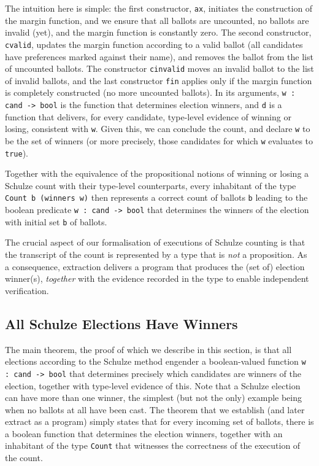 \noindent
The intuition here is simple: the first constructor, \texttt{ax},
initiates the construction of the margin function, and we ensure
that all ballots are uncounted, no ballots are invalid (yet), and the
margin function is constantly zero. The second constructor,
\texttt{cvalid}, updates the margin function according to a valid
ballot (all candidates have preferences marked against their name),
and removes the ballot from the list of uncounted ballots. The
constructor \texttt{cinvalid} moves an invalid ballot to the list of
invalid ballots, and the last constructor \texttt{fin} applies only
if the margin function is completely constructed (no more uncounted
ballots). In its arguments, \texttt{w : cand -> bool} is the function
that determines election winners, and \texttt{d} is a function that
delivers, for every candidate, type-level evidence of winning or
losing, consistent with \texttt{w}. Given this, we can conclude the
count, and declare \texttt{w} to be the set of winners (or more
precisely, those candidates for which \texttt{w} evaluates to
\texttt{true}).

Together with the equivalence of the propositional notions of
winning or losing a Schulze count with their type-level
counterparts, every inhabitant of the type \texttt{Count b (winners
w)} then represents a correct count of ballots \texttt{b} leading to
the boolean predicate \texttt{w : cand -> bool} that determines the
winners of the election with initial set \texttt{b} of ballots.

The crucial aspect of our formalisation of executions of Schulze
counting is that the transcript of the count is represented by a
type that is \emph{not} a proposition. As a consequence, extraction
delivers a program that produces the (set of) election winner(s),
\emph{together} with the evidence recorded in the type to enable
independent verification.




\subsection{All Schulze Elections Have Winners}
\label{sec:all_winners}
The main theorem, the proof of which we describe in this section, is
that all elections according to the Schulze method engender a
boolean-valued function \texttt{w : cand -> bool}
that determines
precisely which candidates are winners of the election, together
with type-level evidence of this.
Note that a Schulze election can have more
than one winner, the simplest (but not the only) example being when
no ballots at all have been cast.
The theorem that we establish (and later extract as a program)
simply states that for every incoming set of ballots, there is a
boolean function that determines the election winners, together with
an inhabitant of the type \texttt{Count} that witnesses the
correctness of the execution of the count. 

